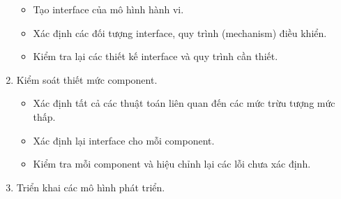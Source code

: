 \documentclass[./../SoftwareEngineering.tex]{subfiles}
\begin{document}
\begin{multicols}{2}
\begin{enumerate}
\begin{itemize}
				\item Tạo interface của mô hình hành vi.
				
				\item Xác định các đối tượng interface, quy trình (mechanism) điều khiển.
				
				\item Kiểm tra lại các thiết kế interface và quy trình cần thiết.
			\end{itemize}
			
			
			
			\item Kiểm soát thiết mức component.
			\begin{itemize}
				\setlength{\itemsep}{1pt}
				\item Xác định tất cả các thuật toán liên quan đến các mức trừu tượng mức thấp.
				
				\item Xác định lại interface cho mỗi component.
				
				\item Kiểm tra mỗi component và hiệu chỉnh lại các lỗi chưa xác định.
			\end{itemize}
			
			\item Triển khai các mô hình phát triển.
		\end{enumerate}	
	\end{multicols}
\end{document}
